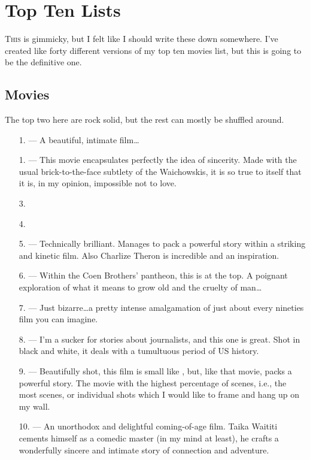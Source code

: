\documentclass[../butidigress.tex]{subfiles}
\begin{document}
\chapter{Top Ten Lists}\label{chap:topten}
\newpage

\lettrine{T}{his} is gimmicky, but I felt like I should write these down somewhere.
I've created like forty different versions of my top ten movies list, but this is going to be the definitive one.

\section{Movies}\label{sec:moviestopten}
The top two here are rock solid, but the rest can mostly be shuffled around.

\begin{itemize}
    \item[1.] \textbf{} --- A beautiful, intimate film\ldots{}
    \item[1.] \textbf{} --- This movie encapsulates perfectly the idea of sincerity. Made with the usual brick-to-the-face subtlety of the Waichowskis, it is so true to itself that it is, in my opinion, impossible not to love.
    \item[3.]
    \item[4.] \textbf{}
    \item[5.] \textbf{} --- Technically brilliant. Manages to pack a powerful story within a striking and kinetic film. Also Charlize Theron is incredible and an inspiration.
    \item[6.] \textbf{} --- Within the Coen Brothers' pantheon, this is at the top. A poignant exploration of what it means to grow old and the cruelty of man\ldots
    \item[7.] \textbf{} --- Just bizarre\ldots a pretty intense amalgamation of just about every nineties film you can imagine.
    \item[8.] \textbf{} --- I'm a sucker for stories about journalists, and this one is great. Shot in black and white, it deals with a tumultuous period of US history.
    \item[9.] \textbf{} --- Beautifully shot, this film is small like , but, like that movie, packs a powerful story. The movie with the highest percentage of  scenes, i.e., the most scenes, or individual shots which I would like to frame and hang up on my wall.
    \item[10.] \textbf{} --- An unorthodox and delightful coming-of-age film. Taika Waititi cements himself as a comedic master (in my mind at least), he crafts a wonderfully sincere and intimate story of connection and adventure.
\end{itemize}
\end{document}
